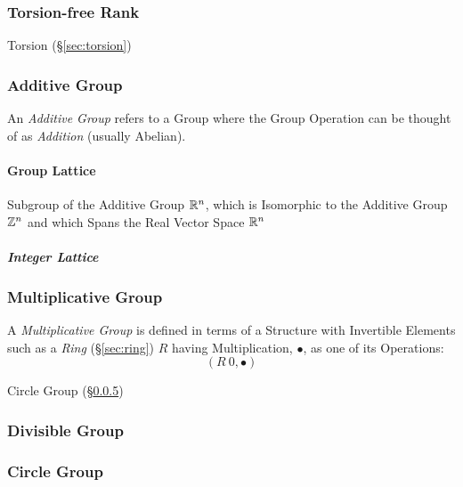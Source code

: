\subsubsection{Torsion-free Rank}\label{sec:torsionfree_rank}

Torsion (\S\ref{sec:torsion})



\subsubsection{Additive Group}\label{sec:additive_group}

An \emph{Additive Group} refers to a Group where the Group Operation
can be thought of as \emph{Addition} (usually Abelian).



\paragraph{Group Lattice}\label{sec:group_lattice}\hfill

Subgroup of the Additive Group $\mathbb{R}^n$, which is Isomorphic to the Additive
Group $\mathbb{Z}^n$ and which Spans the Real Vector Space $\mathbb{R}^n$



\subparagraph{Integer Lattice}\label{sec:integer_lattice}\hfill



\subsubsection{Multiplicative Group}\label{sec:multiplicative_group}

A \emph{Multiplicative Group} is defined in terms of a Structure with
Invertible Elements such as a \emph{Ring} (\S\ref{sec:ring}) $R$
having Multiplication, $\bullet$, as one of its Operations:
\[
  (R \ {0}, \bullet)
\]

Circle Group (\S\ref{sec:circle_group})



\subsubsection{Divisible Group}\label{sec:divisible_group}

\subsubsection{Circle Group}\label{sec:circle_group}

